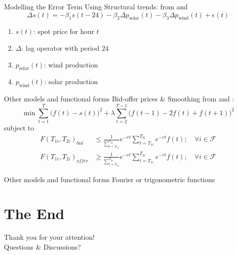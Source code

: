 \documentclass{beamer}
\begin{document}
\begin{frame}{Modelling the Error Term}
    Using Structural trends: from \cite{deJongDijkenEnev-2013} and \cite{BurgerGraeberSchindlmayr-2014}
    \[
        \Delta s(t) = -\beta_1 s(t-24)
        - \beta_2 \Delta p_{\text{solar}}(t)
        - \beta_3 \Delta p_{\text{wind}}(t)
        + \epsilon(t)
    \]
    \begin{enumerate}[label=$\bullet$]
        \item $s(t)$: spot price for hour $t$
        \item $\Delta$: lag operator with period $24$
        \item $p_{\text{solar}}(t)$: wind production
        \item $p_{\text{wind}}(t)$: solar production
    \end{enumerate}
\end{frame}



\begin{frame}{Other models and functional forms}
    Bid-offer prices \& Smoothing from \cite{FletenLemming-2003} and \cite{BurgerGraeberSchindlmayr-2014}:
    \[
        \min \sum_{t=1}^T \bigg(f(t) - s(t) \bigg)^2
        + \lambda \sum_{t=2}^{T-1} \bigg(
        f(t-1) - 2 f(t) + f(t+1)
        \bigg)^2
    \]
    subject to
    \begin{align*}
        F(T_{1i}, T_{2i})_{bid}
         & \leq
        \frac{1}{\sum_{t=T_{1i}}^{T_{2i}}} e^{-rt}
        \sum_{t=T_{1i}}^{T_{2i}} e^{-rt} f(t);
        \quad \forall i \in \mathcal{F}
        \\
        F(T_{1i}, T_{2i})_{offer}
         & \geq
        \frac{1}{\sum_{t=T_{1i}}^{T_{2i}}} e^{-rt}
        \sum_{t=T_{1i}}^{T_{2i}} e^{-rt} f(t);
        \quad \forall i \in \mathcal{F}
    \end{align*}
\end{frame}


\begin{frame}{Other models and functional forms}
    Fourier or trigonometric functions
\end{frame}


\section{The End}

\begin{frame}
    \centering
    \Huge
    Thank you for your attention! \\[0.5cm] Questions \& Discussions?
\end{frame}

\nocite{*}

\end{document}
